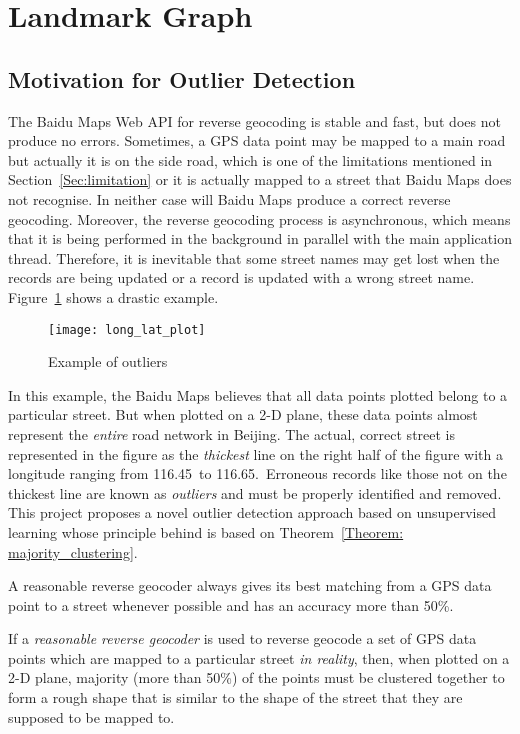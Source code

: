 \section{Landmark Graph}\label{outlier_detecting}
\subsection{Motivation for Outlier Detection}
The Baidu Maps Web API for reverse geocoding is stable and fast, but does not produce no errors. Sometimes, a GPS data point may be mapped to a main road but actually it is on the side road, which is one of the limitations mentioned in Section~\ref{Sec:limitation} or it is actually mapped to a street that Baidu Maps does not recognise. In neither case will Baidu Maps produce a correct reverse geocoding. Moreover, the reverse geocoding process is asynchronous, which means that it is being performed in the background in parallel with the main application thread. Therefore, it is inevitable that some street names may get lost when the records are being updated or a record is updated with a wrong street name. Figure~\ref{Fig:exmp_outlier} shows a drastic example.

\begin{figure}[h]
\texttt{[image: long\_lat\_plot]}
\centering
\caption{Example of outliers}\label{Fig:exmp_outlier}
\end{figure}

In this example, the Baidu Maps believes that all data points plotted belong to a particular street. But when plotted on a 2-D plane, these data points almost represent the \emph{entire} road network in Beijing. The actual, correct street is represented in the figure as the \emph{thickest} line on the right half of the figure with a longitude ranging from 116.45\textdegree~to 116.65\textdegree.~Erroneous records like those not on the thickest line are known as \emph{outliers} and must be properly identified and removed. This project proposes a novel outlier detection approach based on unsupervised learning whose principle behind is based on Theorem~\ref{Theorem: majority_clustering}.

\begin{defn}\label{Def:reasonable_geocoder}
A reasonable reverse geocoder always gives its best matching from a GPS data point to a street whenever possible and has an accuracy more than 50\%.
\end{defn}

\begin{theorem}\label{Theorem: majority_clustering}
If a \emph{reasonable reverse geocoder} is used to reverse geocode a set of GPS data points which are mapped to a particular street \emph{in reality}, then, when plotted on a 2-D plane, majority (more than 50\%) of the points must be clustered together to form a rough shape that is similar to the shape of the street that they are supposed to be mapped to. 
\end{theorem}

